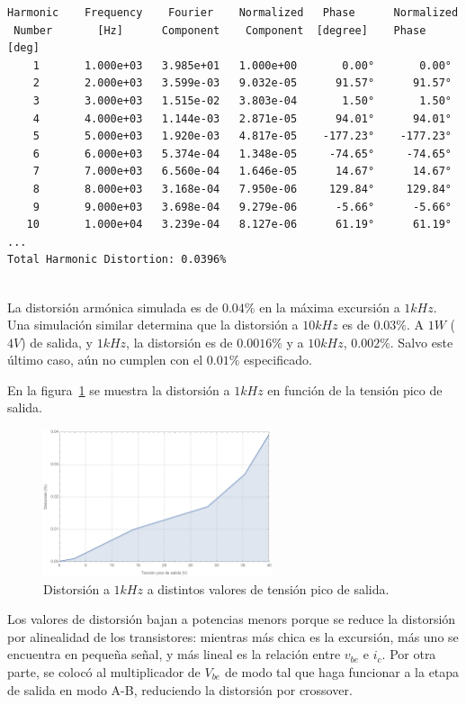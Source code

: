 \documentclass[a4paper,12pt,twoside]{article}
\begin{document}
\begin{verbatim}
Harmonic	Frequency	 Fourier 	Normalized	 Phase  	Normalized
 Number 	  [Hz]   	Component	 Component	[degree]	Phase [deg]
    1   	1.000e+03	3.985e+01	1.000e+00	    0.00°	    0.00°
    2   	2.000e+03	3.599e-03	9.032e-05	   91.57°	   91.57°
    3   	3.000e+03	1.515e-02	3.803e-04	    1.50°	    1.50°
    4   	4.000e+03	1.144e-03	2.871e-05	   94.01°	   94.01°
    5   	5.000e+03	1.920e-03	4.817e-05	 -177.23°	 -177.23°
    6   	6.000e+03	5.374e-04	1.348e-05	  -74.65°	  -74.65°
    7   	7.000e+03	6.560e-04	1.646e-05	   14.67°	   14.67°
    8   	8.000e+03	3.168e-04	7.950e-06	  129.84°	  129.84°
    9   	9.000e+03	3.698e-04	9.279e-06	   -5.66°	   -5.66°
   10   	1.000e+04	3.239e-04	8.127e-06	   61.19°	   61.19°
...
Total Harmonic Distortion: 0.0396%


\end{verbatim}

La distorsión armónica simulada es de $0.04\%$ en la máxima excursión a $1kHz$. Una simulación similar determina que la distorsión a $10kHz$ es de $0.03\%$. A $1W$ ($4V$) de salida, y $1kHz$, la distorsión es de $0.0016\%$ y a $10kHz$, $0.002\%$. Salvo este último caso, aún no cumplen con el $0.01\%$ especificado.


En la figura~\ref{fig:distorsion-barrido} se muestra la distorsión a $1kHz$ en función de la tensión pico de salida.

\begin{figure}[H]
	\centering
	\includegraphics[width=0.6\textwidth]{img/sim/distorsion-barrido}
	\caption{Distorsión a $1kHz$ a distintos valores de tensión pico de salida.}
	\label{fig:distorsion-barrido}
\end{figure}

Los valores de distorsión bajan a potencias menors porque se reduce la distorsión por alinealidad de los transistores: mientras más chica es la excursión, más uno se encuentra en pequeña señal, y más lineal es la relación entre $v_{be}$ e $i_c$. Por otra parte, se colocó al multiplicador de $V_{be}$ de modo tal que haga funcionar a la etapa de salida en modo A-B, reduciendo la distorsión por crossover.
\end{document}
